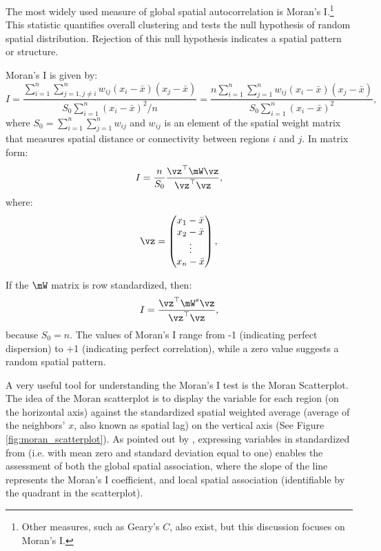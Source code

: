 \documentclass[english,12pt]{book}\usepackage[]{graphicx}\usepackage[]{xcolor}
\begin{document}
The most widely used measure of global spatial autocorrelation is Moran's I.\footnote{Other measures, such as Geary's $C$, also exist, but this discussion focuses on Moran's I.} This statistic quantifies overall clustering and tests the null hypothesis of random spatial distribution. Rejection of this null hypothesis indicates a spatial pattern or structure.


Moran's I is given by:
\begin{equation}\label{eq:I-moran}
I = \frac{\sum_{i = 1}^n\sum_{j=1, j\neq i}^n w_{ij}\left(x_i - \bar{x}\right)\left(x_j - \bar{x}\right)}{S_0 \sum_{i = 1}^n\left(x_i - \bar{x}\right)^2/n} = \frac{n\sum_{i = 1}^n\sum_{j=1}^n w_{ij}\left(x_i - \bar{x}\right)\left(x_j - \bar{x}\right)}{S_0 \sum_{i = 1}^n\left(x_i - \bar{x}\right)^2},
\end{equation}
%
where $S_0=\sum_{i = 1}^n\sum_{j=1}^nw_{ij}$ and $w_{ij}$ is an element of the spatial weight matrix that measures spatial distance or connectivity between regions $i$ and $j$.
In matrix form:
\begin{equation*}
	I = \frac{n}{S_0} \frac{\vz^\top\mW\vz}{\vz^\top\vz},
\end{equation*}
%
where: 
\begin{equation*}
\vz = \begin{pmatrix}
          x_1 - \bar{x}\\
          x_2 - \bar{x} \\
          \vdots\\
          x_n - \bar{x}
      \end{pmatrix},
\end{equation*}

If the $\mW$ matrix is row standardized, then:
\begin{equation*}
	I = \frac{\vz^\top\mW^s\vz}{\vz^\top\vz},
\end{equation*}
%
because $S_0=n$.  The values of Moran's I range from -1 (indicating perfect dispersion) to +1 (indicating perfect correlation), while a zero value suggests a random spatial pattern.


A very useful tool for understanding the Moran's I test is the Moran Scatterplot. The idea of the Moran scatterplot is to display the variable for each region (on the horizontal axis) against the standardized spatial weighted average (average of the neighbors' $x$, also known as spatial lag) on the vertical axis (See Figure \ref{fig:moran_scatterplot}). As pointed out by \cite{anselin1996chapter}, expressing  variables in standardized from (i.e. with mean zero and standard deviation equal to one) enables the assessment of both the global spatial association, where the slope of the line represents the Moran's I coefficient, and local spatial association (identifiable by the quadrant in the scatterplot). 
\end{document}
